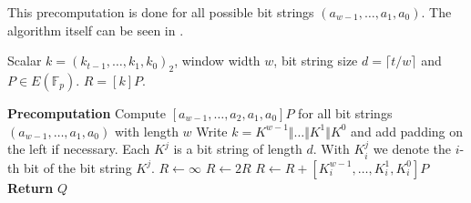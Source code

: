 %
This precomputation is done for all possible bit strings $(a_{w - 1}, \ldots, a_1, a_0)$.
The algorithm itself can be seen in .
%
\begin{algorithm}
	\algorithmicrequire Scalar $k = (k_{t-1}, \ldots, k_1, k_0)_2$, window width $w$, bit string size $d = \lceil t / w\rceil$ and $P \in E(\mathbb{F}_p)$.
	\algorithmicensure $R = [k]P$.
	\begin{algorithmic}[1]
		\Statex \textbf{Precomputation}
		\State Compute $[ a_{w - 1}, \ldots, a_2, a_1, a_0 ]P$ for all bit strings  $(a_{w - 1}, \ldots, a_1, a_0)$ with length $w$
		\State Write $k = K^{w-1} \Vert \dots \Vert  K^{1} \Vert K^0$ and add padding on the left if necessary. Each $K^j$ is a bit string of length $d$. With $K_i^j$ we denote the $i$-th bit of the bit string $K^j$.
			\State $R \gets \infty$
			\State $R \gets 2R$
			\State $R \gets R + \left[ K_i^{w-1}, \ldots, K_i^1, K_i^0 \right] P$
		\EndFor
		\State \textbf{Return} $Q$
	\end{algorithmic}
	\label{algo: Fixed-base comb method for point multiplication}
\end{algorithm}
%

